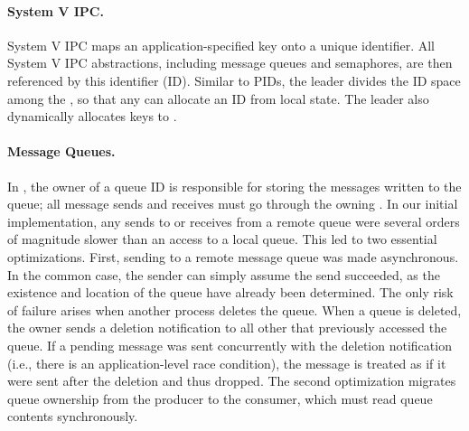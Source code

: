\paragraph{System V IPC.} System V IPC
maps an application-specified key onto a unique identifier.
All System V IPC abstractions, including message queues and semaphores,
are then referenced by this identifier (ID).
Similar to PIDs, 
the leader divides the ID space among the \picoprocs{}, so that any \picoproc{}
can allocate an ID from local state. %
The leader also dynamically allocates keys to \picoprocs{}.

\paragraph{Message Queues.} In \graphene{}, the owner of a queue ID is responsible for 
storing the messages written to the queue; all message sends and receives must 
go through the owning \picoproc{}.  
In our initial implementation, any sends to or receives from a remote queue were several
orders of magnitude slower than an access to a local queue.
This led to two essential optimizations.  
First, sending to a remote
message queue was made asynchronous.  In the common case, the sender can simply assume 
the send succeeded, as the existence and location of the queue have already been determined.
The only risk of failure arises when another process deletes the queue.
When a queue is deleted, the owner sends a deletion notification to all other \picoprocs{}
that previously accessed the queue.
If a pending message was sent concurrently with the deletion notification 
(i.e., there is an application-level race condition), 
the message is treated as if it were sent after the deletion and thus dropped.
The second optimization migrates queue ownership from the producer to the consumer,
which must read queue contents synchronously.


